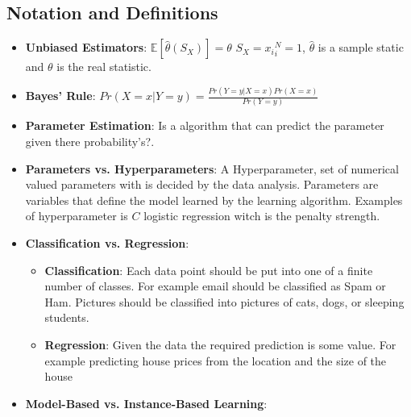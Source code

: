 \begin{multicols}{2}


\subsection{Notation and Definitions}

\begin{itemize}
    \item \textbf{Unbiased Estimators}: \newline
    $\mathbb{E}[\hat{\theta}(S_X)] = \theta$ \newline
    $S_X={x_i}^N_i=1$, $\hat{\theta}$ is a sample static and $\theta$ is the real statistic.
    \item \textbf{Bayes' Rule}: \newline
    $Pr(X=x|Y=y)=\frac{Pr(Y=y|X=x)Pr(X=x)}{Pr(Y=y)}$
    \item \textbf{Parameter Estimation}: \newline
    Is a algorithm that can predict the parameter given there probability's?. 
    \item \textbf{Parameters vs. Hyperparameters}: \newline
    A Hyperparameter, set of numerical valued parameters with is decided by the data analysis.
    Parameters are variables that define the model learned by the learning algorithm. Examples of 
    hyperparameter is $C$ logistic regression witch is the penalty strength.
    \item \textbf{Classification vs. Regression}:
    \begin{itemize}
        \item \textbf{Classification}: Each data point should be put into one of a finite number of
        classes. For example email should be classified as Spam or
        Ham. Pictures should be classified into pictures of cats,
        dogs, or sleeping students. 
        \item \textbf{Regression}: Given the data the required prediction is some value. For
        example predicting house prices from the location and the
        size of the house
    \end{itemize}
    \item \textbf{Model-Based vs. Instance-Based Learning}: \newline

\end{itemize}
\end{multicols}
